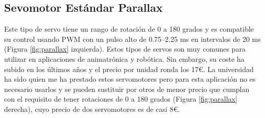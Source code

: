 \setcounter{footnote}{36} %


\subsection{Sevomotor Estándar Parallax}
Este tipo de servo tiene un rango de rotación de 0 a 180 grados y es compatible su control usando \ac{PWM} con un pulso alto de 0.75–2.25 ms en intervalos de 20 ms (Figura \ref{fig:parallax} izquierda). Estos tipos de servos son muy comunes para utilizar en aplicaciones de animatrónica y robótica. Sin embargo, su coste ha subido en los últimos años y el precio por unidad ronda los 17€. La universidad ha sido quien me ha prestado estos servomotores pero para esta aplicación no es necesario usarlos y se pueden sustituir por otros de menor precio que cumplan con el requisito de tener rotaciones de 0 a 180 grados (Figura \ref{fig:parallax} derecha), cuyo precio de dos servomotores es de casi 8€. 


